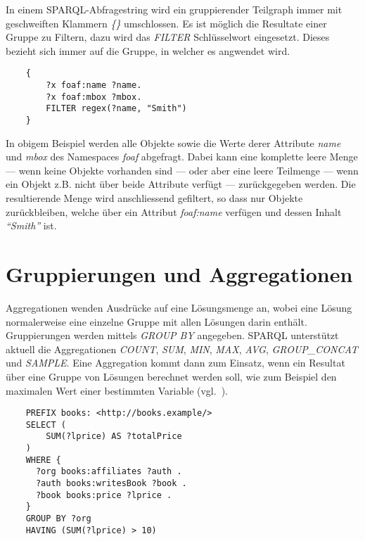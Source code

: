 In einem SPARQL-Abfragestring wird ein gruppierender Teilgraph immer mit geschweiften Klammern \textit{\{\}} umschlossen. Es ist möglich die Resultate einer Gruppe zu Filtern, dazu wird das \textit{FILTER} Schlüsselwort eingesetzt. Dieses bezieht sich immer auf die Gruppe, in welcher es angwendet wird.

\lstset{language=XML}
\begin{lstlisting}
    {
        ?x foaf:name ?name.
        ?x foaf:mbox ?mbox.
        FILTER regex(?name, "Smith")
    }
\end{lstlisting}

In obigem Beispiel werden alle Objekte sowie die Werte derer Attribute \textit{name} und \textit{mbox} des Namespaces \textit{foaf} abgefragt. Dabei kann eine komplette leere Menge --- wenn keine Objekte vorhanden sind --- oder aber eine leere Teilmenge --- wenn ein Objekt z.B. nicht über beide Attribute verfügt --- zurückgegeben werden. Die resultierende Menge wird anschliessend gefiltert, so dass nur Objekte zurückbleiben, welche über ein Attribut \textit{foaf:name} verfügen und dessen Inhalt \textit{``Smith''} ist.

\section{Gruppierungen und Aggregationen}
\label{sec:sparql_gruppierungenaggregationen}

Aggregationen wenden Ausdrücke auf eine Lösungsmenge an, wobei eine Lösung normalerweise eine einzelne Gruppe mit allen Lösungen darin enthält. Gruppierungen werden mittels \textit{GROUP BY} angegeben.
SPARQL unterstützt aktuell die Aggregationen \textit{COUNT}, \textit{SUM}, \textit{MIN}, \textit{MAX}, \textit{AVG}, \textit{GROUP\_CONCAT} und \textit{SAMPLE}. Eine Aggregation kommt dann zum Einsatz, wenn ein Resultat über eine Gruppe von Lösungen berechnet werden soll, wie zum Beispiel den maximalen Wert einer bestimmten Variable (vgl.~\cite[11 Aggregates]{w3sparql_querylang}).

\lstset{language=SQL}
\begin{lstlisting}
    PREFIX books: <http://books.example/>
    SELECT (
        SUM(?lprice) AS ?totalPrice
    )
    WHERE {
      ?org books:affiliates ?auth .
      ?auth books:writesBook ?book .
      ?book books:price ?lprice .
    }
    GROUP BY ?org
    HAVING (SUM(?lprice) > 10)
\end{lstlisting}

